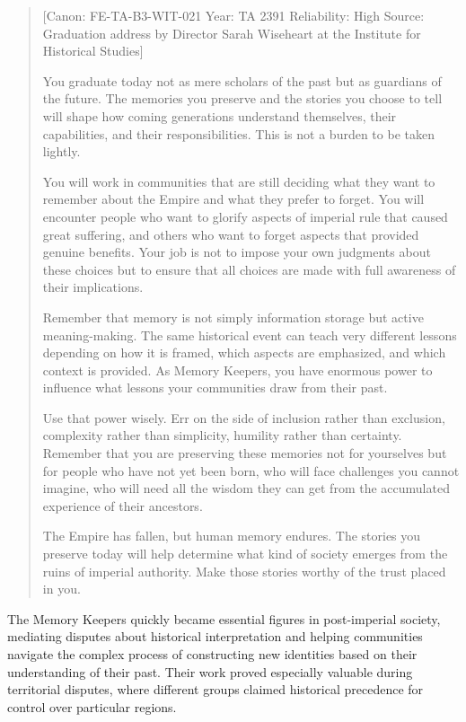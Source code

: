 \begin{quote}
{[}Canon: FE-TA-B3-WIT-021 \textbar{} Year: TA 2391 \textbar{}
Reliability: High \textbar{} Source: Graduation address by Director
Sarah Wiseheart at the Institute for Historical Studies{]}

You graduate today not as mere scholars of the past but as guardians of
the future. The memories you preserve and the stories you choose to tell
will shape how coming generations understand themselves, their
capabilities, and their responsibilities. This is not a burden to be
taken lightly.

You will work in communities that are still deciding what they want to
remember about the Empire and what they prefer to forget. You will
encounter people who want to glorify aspects of imperial rule that
caused great suffering, and others who want to forget aspects that
provided genuine benefits. Your job is not to impose your own judgments
about these choices but to ensure that all choices are made with full
awareness of their implications.

Remember that memory is not simply information storage but active
meaning-making. The same historical event can teach very different
lessons depending on how it is framed, which aspects are emphasized, and
which context is provided. As Memory Keepers, you have enormous power to
influence what lessons your communities draw from their past.

Use that power wisely. Err on the side of inclusion rather than
exclusion, complexity rather than simplicity, humility rather than
certainty. Remember that you are preserving these memories not for
yourselves but for people who have not yet been born, who will face
challenges you cannot imagine, who will need all the wisdom they can get
from the accumulated experience of their ancestors.

The Empire has fallen, but human memory endures. The stories you
preserve today will help determine what kind of society emerges from the
ruins of imperial authority. Make those stories worthy of the trust
placed in you.
\end{quote}

The Memory Keepers quickly became essential figures in post-imperial
society, mediating disputes about historical interpretation and helping
communities navigate the complex process of constructing new identities
based on their understanding of their past. Their work proved especially
valuable during territorial disputes, where different groups claimed
historical precedence for control over particular regions.


